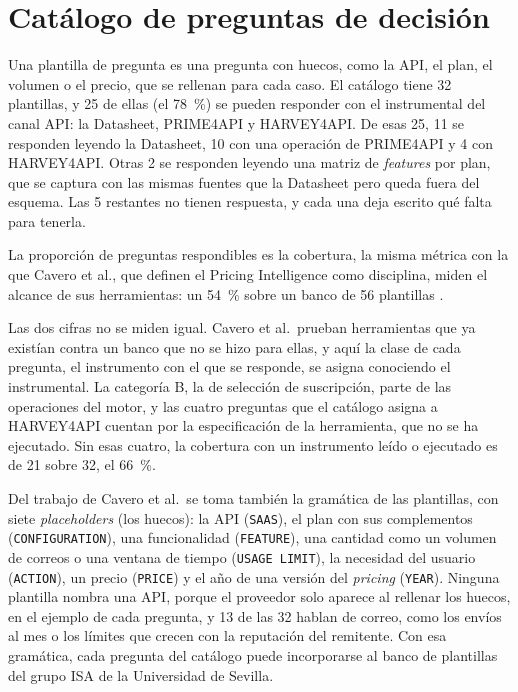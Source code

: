 \section{Catálogo de preguntas de decisión}\label{sec:comparacion:catalogo}\label{sec:hallazgos:catalogo-pi}

Una plantilla de pregunta es una pregunta con huecos, como la API, el plan, el volumen o el precio, que se rellenan para cada caso.
El catálogo tiene 32 plantillas, y 25 de ellas (el 78~\%) se pueden responder con el instrumental del canal API: la Datasheet, PRIME4API y HARVEY4API.
De esas 25, 11 se responden leyendo la Datasheet, 10 con una operación de PRIME4API y 4 con HARVEY4API.
Otras 2 se responden leyendo una matriz de \textit{features} por plan, que se captura con las mismas fuentes que la Datasheet pero queda fuera del esquema.
Las 5 restantes no tienen respuesta, y cada una deja escrito qué falta para tenerla.

La proporción de preguntas respondibles es la cobertura, la misma métrica con la que Cavero et al., que definen el Pricing Intelligence como disciplina, miden el alcance de sus herramientas: un 54~\% sobre un banco de 56 plantillas \citep{cavero2026pricingintelligence}.

Las dos cifras no se miden igual.
Cavero et al.\ prueban herramientas que ya existían contra un banco que no se hizo para ellas, y aquí la clase de cada pregunta, el instrumento con el que se responde, se asigna conociendo el instrumental.
La categoría B, la de selección de suscripción, parte de las operaciones del motor, y las cuatro preguntas que el catálogo asigna a HARVEY4API cuentan por la especificación de la herramienta, que no se ha ejecutado.
Sin esas cuatro, la cobertura con un instrumento leído o ejecutado es de 21 sobre 32, el 66~\%.

Del trabajo de Cavero et al.\ se toma también la gramática de las plantillas, con siete \textit{placeholders} (los huecos): la API (\texttt{SAAS}), el plan con sus complementos (\texttt{CONFIGURATION}), una funcionalidad (\texttt{FEATURE}), una cantidad como un volumen de correos o una ventana de tiempo (\texttt{USAGE LIMIT}), la necesidad del usuario (\texttt{ACTION}), un precio (\texttt{PRICE}) y el año de una versión del \textit{pricing} (\texttt{YEAR}).
Ninguna plantilla nombra una API, porque el proveedor solo aparece al rellenar los huecos, en el ejemplo de cada pregunta, y 13 de las 32 hablan de correo, como los envíos al mes o los límites que crecen con la reputación del remitente.
Con esa gramática, cada pregunta del catálogo puede incorporarse al banco de plantillas del grupo ISA de la Universidad de Sevilla.

